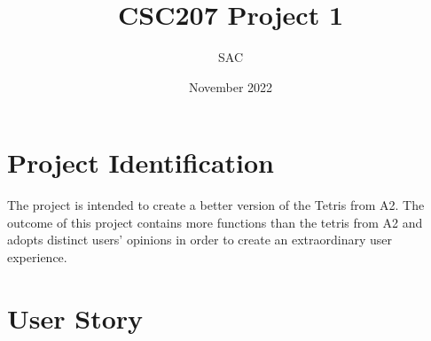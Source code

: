 \documentclass{article}
\title{CSC207 Project 1}
\author{SAC}
\date{November 2022}
\begin{document}
\maketitle

\thispagestyle{fancy}

\section{Project Identification}
 The project is intended to create a better version of the Tetris from A2. The outcome of this project contains more functions than the tetris from A2 and adopts distinct users' opinions in order to create an extraordinary user experience.
\section{User Story}
\end{document}
